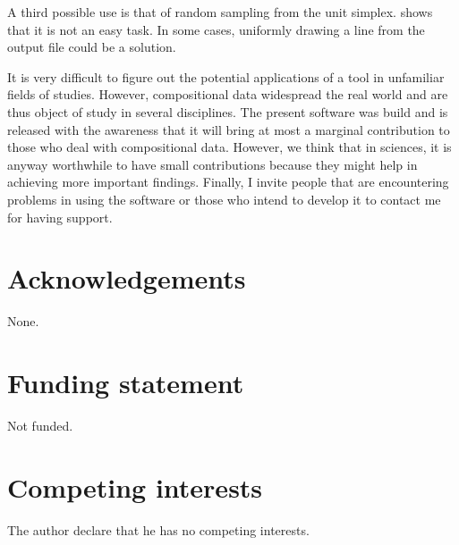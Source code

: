 \documentclass{jors}
\begin{document}
A third possible use is that of random sampling from the unit simplex. \cite{sampling04} shows that it is not an easy task. In some cases, uniformly drawing a line from the output file could be a solution. 

It is very difficult to figure out the potential applications of a tool in unfamiliar fields of studies. However, compositional data widespread the real world and are thus object of study in several disciplines. The present software was build and is released with the awareness that it will bring at most a marginal contribution to those who deal with compositional data. However, we think that in sciences, it is anyway worthwhile to have small contributions because they might help in achieving more important findings. Finally, I invite people that are encountering problems in using the software or those who intend to develop it to contact me for having support.  

\section*{Acknowledgements}
None.

\section*{Funding statement}
Not funded.

\section*{Competing interests}
The author declare that he has no competing interests.



   
  



\end{document}
